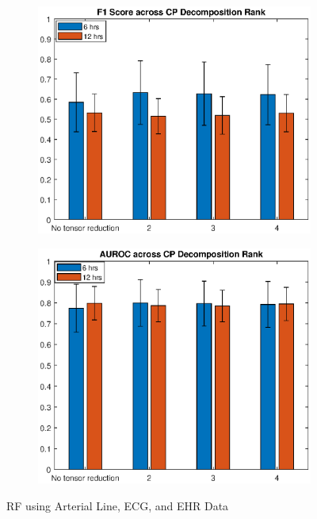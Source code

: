 \begin{figure}[htb]
    \centering
    \begin{subfigure}[htb]{0.49\textwidth}
        \includegraphics[width=\textwidth]{body/figures/bar_sig_ehrRF_f1.eps}
    \end{subfigure}
    \hfill
    \begin{subfigure}[htb]{0.49\textwidth}
        \includegraphics[width=\textwidth]{body/figures/bar_sig_ehrRF_auc.eps}
    \end{subfigure}
    \caption{RF using Arterial Line, ECG, and EHR Data}
    \label{fig:rf_sigEHR}
\end{figure}  %

\clearpage